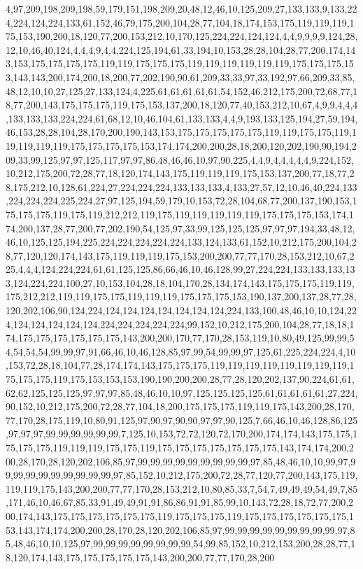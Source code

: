 4,97,209,198,209,198,59,179,151,198,209,20,48,12,46,10,125,209,27,133,133,9,133,224,224,124,224,133,61,152,46,79,175,200,104,28,77,104,18,174,153,175,119,119,119,175,153,190,200,18,120,77,200,153,212,10,170,125,224,224,124,124,4,4,9,9,9,9,124,28,12,10,46,40,124,4,4,4,9,4,4,224,125,194,61,33,194,10,153,28,28,104,28,77,200,174,143,153,175,175,175,175,119,119,175,175,175,119,119,119,119,119,119,175,175,175,153,143,143,200,174,200,18,200,77,202,190,90,61,209,33,33,97,33,192,97,66,209,33,85,48,12,10,10,27,125,27,133,124,4,225,61,61,61,61,61,54,152,46,212,175,200,72,68,77,18,77,200,143,175,175,175,119,175,153,137,200,18,120,77,40,153,212,10,67,4,9,9,4,4,4,133,133,133,224,224,61,68,12,10,46,104,61,133,133,4,4,9,193,133,125,194,27,59,194,46,153,28,28,104,28,170,200,190,143,153,175,175,175,175,175,119,119,175,175,119,119,119,119,119,175,175,175,175,153,174,174,200,200,28,18,200,120,202,190,90,194,209,33,99,125,97,97,125,117,97,97,86,48,46,46,10,97,90,225,4,4,9,4,4,4,4,4,9,224,152,10,212,175,200,72,28,77,18,120,174,143,175,119,119,119,175,153,137,200,77,18,77,28,175,212,10,128,61,224,27,224,224,224,133,133,133,4,133,27,57,12,10,46,40,224,133,224,224,224,225,224,27,97,125,194,59,179,10,153,72,28,104,68,77,200,137,190,153,175,175,175,119,175,119,212,212,119,175,119,119,119,119,119,175,175,175,153,174,174,200,137,28,77,200,77,202,190,54,125,97,33,99,125,125,125,97,97,97,194,33,48,12,46,10,125,125,194,225,224,224,224,224,224,133,124,133,61,152,10,212,175,200,104,28,77,120,120,174,143,175,119,119,119,175,153,200,200,77,77,170,28,153,212,10,67,225,4,4,4,124,224,224,61,61,125,125,86,66,46,10,46,128,99,27,224,224,133,133,133,133,124,224,224,100,27,10,153,104,28,18,104,170,28,134,174,143,175,175,175,119,119,175,212,212,119,119,175,175,119,119,119,175,175,175,153,190,137,200,137,28,77,28,120,202,106,90,124,224,124,124,124,124,124,124,124,224,133,100,48,46,10,10,124,224,124,124,124,124,124,224,224,224,224,224,99,152,10,212,175,200,104,28,77,18,18,174,175,175,175,175,175,175,143,200,200,170,77,170,28,153,119,10,80,49,125,99,99,54,54,54,54,99,99,97,91,66,46,10,46,128,85,97,99,54,99,99,97,125,61,225,224,224,4,10,153,72,28,18,104,77,28,174,174,143,175,175,175,119,119,119,119,119,119,119,119,175,175,175,119,175,153,153,153,190,190,200,200,28,77,28,120,202,137,90,224,61,61,62,62,125,125,125,97,97,97,85,48,46,10,10,97,125,125,125,125,61,61,61,61,61,27,224,90,152,10,212,175,200,72,28,77,104,18,200,175,175,175,119,119,175,143,200,28,170,77,170,28,175,119,10,80,91,125,97,90,97,90,90,97,97,90,125,7,66,46,10,46,128,86,125,97,97,97,99,99,99,99,99,99,7,125,10,153,72,72,120,72,170,200,174,174,143,175,175,175,175,175,119,119,119,175,175,119,175,175,175,175,175,175,175,143,174,174,200,200,28,170,28,120,202,106,85,97,99,99,99,99,99,99,99,99,99,97,85,48,46,10,10,99,97,99,99,99,99,99,99,99,99,99,97,85,152,10,212,175,200,72,28,77,120,77,200,143,175,119,119,119,175,143,200,200,77,77,170,28,153,212,10,80,85,33,7,54,7,49,49,49,54,49,7,85,171,46,10,46,67,85,33,91,49,49,91,91,86,86,91,91,85,99,10,143,72,28,18,72,77,200,200,174,143,175,175,175,175,175,175,119,175,175,175,119,175,175,175,175,175,175,153,143,174,174,200,200,28,170,28,120,202,106,85,97,99,99,99,99,99,99,99,99,99,97,85,48,46,10,10,125,97,99,99,99,99,99,99,99,99,54,99,85,152,10,212,153,200,28,28,77,18,120,174,143,175,175,175,175,175,143,200,200,77,77,170,28,200